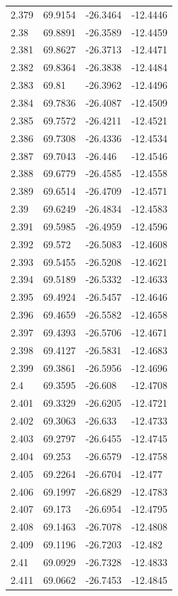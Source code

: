 \begin{tabular}{llll}
2.379 & 69.9154 & -26.3464 & -12.4446 \\
2.38 & 69.8891 & -26.3589 & -12.4459 \\
2.381 & 69.8627 & -26.3713 & -12.4471 \\
2.382 & 69.8364 & -26.3838 & -12.4484 \\
2.383 & 69.81 & -26.3962 & -12.4496 \\
2.384 & 69.7836 & -26.4087 & -12.4509 \\
2.385 & 69.7572 & -26.4211 & -12.4521 \\
2.386 & 69.7308 & -26.4336 & -12.4534 \\
2.387 & 69.7043 & -26.446 & -12.4546 \\
2.388 & 69.6779 & -26.4585 & -12.4558 \\
2.389 & 69.6514 & -26.4709 & -12.4571 \\
2.39 & 69.6249 & -26.4834 & -12.4583 \\
2.391 & 69.5985 & -26.4959 & -12.4596 \\
2.392 & 69.572 & -26.5083 & -12.4608 \\
2.393 & 69.5455 & -26.5208 & -12.4621 \\
2.394 & 69.5189 & -26.5332 & -12.4633 \\
2.395 & 69.4924 & -26.5457 & -12.4646 \\
2.396 & 69.4659 & -26.5582 & -12.4658 \\
2.397 & 69.4393 & -26.5706 & -12.4671 \\
2.398 & 69.4127 & -26.5831 & -12.4683 \\
2.399 & 69.3861 & -26.5956 & -12.4696 \\
2.4 & 69.3595 & -26.608 & -12.4708 \\
2.401 & 69.3329 & -26.6205 & -12.4721 \\
2.402 & 69.3063 & -26.633 & -12.4733 \\
2.403 & 69.2797 & -26.6455 & -12.4745 \\
2.404 & 69.253 & -26.6579 & -12.4758 \\
2.405 & 69.2264 & -26.6704 & -12.477 \\
2.406 & 69.1997 & -26.6829 & -12.4783 \\
2.407 & 69.173 & -26.6954 & -12.4795 \\
2.408 & 69.1463 & -26.7078 & -12.4808 \\
2.409 & 69.1196 & -26.7203 & -12.482 \\
2.41 & 69.0929 & -26.7328 & -12.4833 \\
2.411 & 69.0662 & -26.7453 & -12.4845 \\

\end{tabular}
